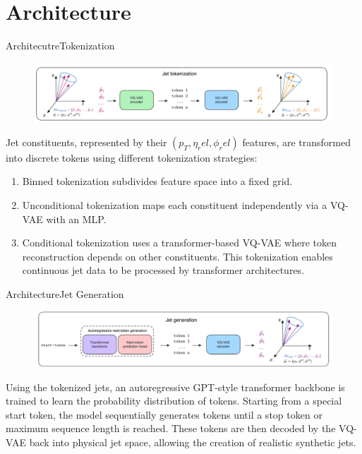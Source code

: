 \documentclass[10pt]{beamer}
\begin{document}
\section{Architecture}
\begin{frame}{Architecutre}{Tokenization}

\begin{figure}
  \includegraphics[width=\textwidth]{jet_tokenization.png}
\end{figure}

Jet constituents, represented by their
$(p_T,\eta_rel,\phi_rel)$
       features, are transformed into discrete tokens using different tokenization strategies:
       \begin{enumerate}
         \item Binned tokenization subdivides feature space into a fixed grid.
         \item Unconditional tokenization maps each constituent independently via a VQ-VAE with an MLP.
         \item Conditional tokenization uses a transformer-based VQ-VAE where token reconstruction depends on other constituents.
      This tokenization enables continuous jet data to be processed by transformer architectures.
       \end{enumerate}

\end{frame}

\begin{frame}{Architecture}{Jet Generation}

\begin{figure}
  \includegraphics[width=\textwidth]{jet_generation.png}
\end{figure}

Using the tokenized jets, an autoregressive GPT-style transformer backbone is trained to learn the probability distribution of tokens. Starting from a special start token, the model sequentially generates tokens until a stop token or maximum sequence length is reached. These tokens are then decoded by the VQ-VAE back into physical jet space, allowing the creation of realistic synthetic jets.

\end{frame}
\end{document}

